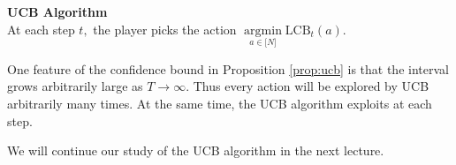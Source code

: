 \documentclass[11pt]{article}
\newcommand{\bN}{\lbrack N \rbrack}
\DeclareMathOperator*{\argmin}{argmin}
\begin{document}
\begin{addmargin}[1em]{0em}%
{\large \textbf{UCB Algorithm}} \\
At each step $t,$ the player picks the action  $\argmin\limits_{a \in \bN} \text{LCB}_t(a).$

\end{addmargin}

One feature of the confidence bound in Proposition \ref{prop:ucb} is that the interval grows arbitrarily large as $T \rightarrow \infty$. Thus every action will be explored by UCB arbitrarily many times. At the same time, the UCB algorithm exploits at each step.

We will continue our study of the UCB algorithm in the next lecture.

\end{document}
